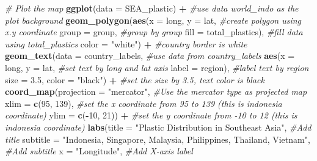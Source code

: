 \documentclass[
]{article}
\newenvironment{Shaded}{\begin{snugshade}}{\end{snugshade}}
\newcommand{\AttributeTok}[1]{\textcolor[rgb]{0.13,0.29,0.53}{#1}}
\newcommand{\CommentTok}[1]{\textcolor[rgb]{0.56,0.35,0.01}{\textit{#1}}}
\newcommand{\DecValTok}[1]{\textcolor[rgb]{0.00,0.00,0.81}{#1}}
\newcommand{\FloatTok}[1]{\textcolor[rgb]{0.00,0.00,0.81}{#1}}
\newcommand{\FunctionTok}[1]{\textcolor[rgb]{0.13,0.29,0.53}{\textbf{#1}}}
\newcommand{\NormalTok}[1]{#1}
\newcommand{\SpecialCharTok}[1]{\textcolor[rgb]{0.81,0.36,0.00}{\textbf{#1}}}
\newcommand{\StringTok}[1]{\textcolor[rgb]{0.31,0.60,0.02}{#1}}
\begin{document}
\begin{Shaded}
\begin{Highlighting}[]
\CommentTok{\# Plot the map}
\FunctionTok{ggplot}\NormalTok{(}\AttributeTok{data =}\NormalTok{ SEA\_plastic) }\SpecialCharTok{+}                          \CommentTok{\#use data world\_indo as the plot background}
  \FunctionTok{geom\_polygon}\NormalTok{(}\FunctionTok{aes}\NormalTok{(}\AttributeTok{x =}\NormalTok{ long, }\AttributeTok{y =}\NormalTok{ lat,                 }\CommentTok{\#create polygon using x.y coordinate}
                   \AttributeTok{group =}\NormalTok{ group,                     }\CommentTok{\#group by group}
                   \AttributeTok{fill =}\NormalTok{ total\_plastics),            }\CommentTok{\#fill data using total\_plastics}
               \AttributeTok{color =} \StringTok{"white"}\NormalTok{) }\SpecialCharTok{+}                     \CommentTok{\#country border is white}
  \FunctionTok{geom\_text}\NormalTok{(}\AttributeTok{data =}\NormalTok{ country\_labels,                    }\CommentTok{\#use data from country\_labels}
            \FunctionTok{aes}\NormalTok{(}\AttributeTok{x =}\NormalTok{ long, }\AttributeTok{y =}\NormalTok{ lat,                    }\CommentTok{\#set text by long and lat axis}
                \AttributeTok{label =}\NormalTok{ region),                      }\CommentTok{\#label text by region}
            \AttributeTok{size =} \FloatTok{3.5}\NormalTok{,  }\AttributeTok{color =} \StringTok{"black"}\NormalTok{) }\SpecialCharTok{+}           \CommentTok{\#set the size by 3.5, text color is black}
  \FunctionTok{coord\_map}\NormalTok{(}\AttributeTok{projection =} \StringTok{"mercator"}\NormalTok{, }\CommentTok{\#Use the mercator type as projected map}
            \AttributeTok{xlim =} \FunctionTok{c}\NormalTok{(}\DecValTok{95}\NormalTok{, }\DecValTok{139}\NormalTok{),       }\CommentTok{\#set the x coordinate from 95 to 139 (this is indonesia coordinate) }
            \AttributeTok{ylim =} \FunctionTok{c}\NormalTok{(}\SpecialCharTok{{-}}\DecValTok{10}\NormalTok{, }\DecValTok{21}\NormalTok{)) }\SpecialCharTok{+}     \CommentTok{\#set the y coordinate from {-}10 to 12 (this is indonesia coordinate)}
  \FunctionTok{labs}\NormalTok{(}\AttributeTok{title =} \StringTok{"Plastic Distribution in Southeast Asia"}\NormalTok{,  }\CommentTok{\#Add title}
       \AttributeTok{subtitle =} \StringTok{"Indonesia, Singapore, Malaysia, Philippines, Thailand, Vietnam"}\NormalTok{,   }\CommentTok{\#Add subtitle}
       \AttributeTok{x =} \StringTok{"Longitude"}\NormalTok{,                                   }\CommentTok{\#Add X{-}axis label}

\end{Highlighting}
\end{Shaded}
\end{document}
